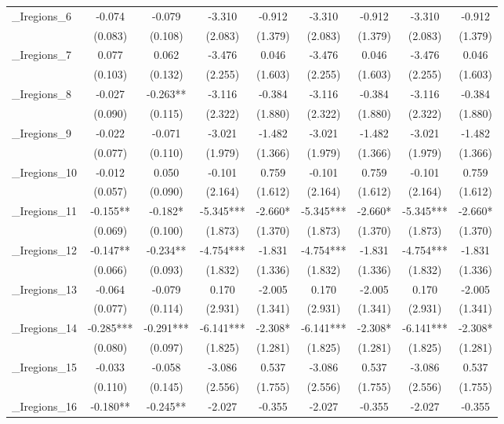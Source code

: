 \documentclass[]{article}
\begin{document}
\begin{tabular}{lcccccccc}
\_Iregions\_6 & -0.074 & -0.079 & -3.310 & -0.912 & -3.310 & -0.912 & -3.310 & -0.912 \\
 & (0.083) & (0.108) & (2.083) & (1.379) & (2.083) & (1.379) & (2.083) & (1.379) \\
\_Iregions\_7 & 0.077 & 0.062 & -3.476 & 0.046 & -3.476 & 0.046 & -3.476 & 0.046 \\
 & (0.103) & (0.132) & (2.255) & (1.603) & (2.255) & (1.603) & (2.255) & (1.603) \\
\_Iregions\_8 & -0.027 & -0.263** & -3.116 & -0.384 & -3.116 & -0.384 & -3.116 & -0.384 \\
 & (0.090) & (0.115) & (2.322) & (1.880) & (2.322) & (1.880) & (2.322) & (1.880) \\
\_Iregions\_9 & -0.022 & -0.071 & -3.021 & -1.482 & -3.021 & -1.482 & -3.021 & -1.482 \\
 & (0.077) & (0.110) & (1.979) & (1.366) & (1.979) & (1.366) & (1.979) & (1.366) \\
\_Iregions\_10 & -0.012 & 0.050 & -0.101 & 0.759 & -0.101 & 0.759 & -0.101 & 0.759 \\
 & (0.057) & (0.090) & (2.164) & (1.612) & (2.164) & (1.612) & (2.164) & (1.612) \\
\_Iregions\_11 & -0.155** & -0.182* & -5.345*** & -2.660* & -5.345*** & -2.660* & -5.345*** & -2.660* \\
 & (0.069) & (0.100) & (1.873) & (1.370) & (1.873) & (1.370) & (1.873) & (1.370) \\
\_Iregions\_12 & -0.147** & -0.234** & -4.754*** & -1.831 & -4.754*** & -1.831 & -4.754*** & -1.831 \\
 & (0.066) & (0.093) & (1.832) & (1.336) & (1.832) & (1.336) & (1.832) & (1.336) \\
\_Iregions\_13 & -0.064 & -0.079 & 0.170 & -2.005 & 0.170 & -2.005 & 0.170 & -2.005 \\
 & (0.077) & (0.114) & (2.931) & (1.341) & (2.931) & (1.341) & (2.931) & (1.341) \\
\_Iregions\_14 & -0.285*** & -0.291*** & -6.141*** & -2.308* & -6.141*** & -2.308* & -6.141*** & -2.308* \\
 & (0.080) & (0.097) & (1.825) & (1.281) & (1.825) & (1.281) & (1.825) & (1.281) \\
\_Iregions\_15 & -0.033 & -0.058 & -3.086 & 0.537 & -3.086 & 0.537 & -3.086 & 0.537 \\
 & (0.110) & (0.145) & (2.556) & (1.755) & (2.556) & (1.755) & (2.556) & (1.755) \\
\_Iregions\_16 & -0.180** & -0.245** & -2.027 & -0.355 & -2.027 & -0.355 & -2.027 & -0.355 \\

\end{tabular}
\end{document}

